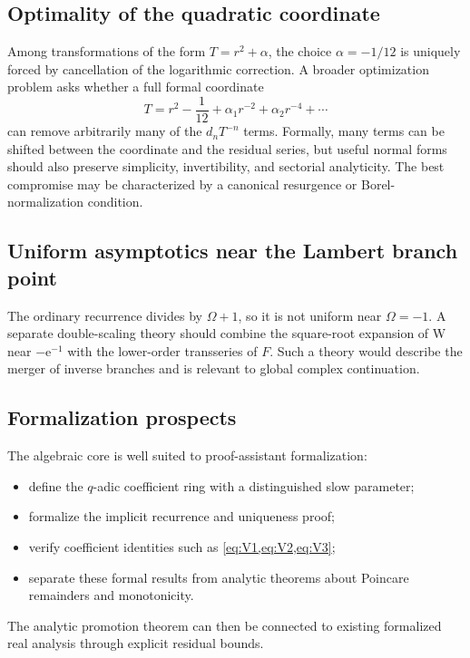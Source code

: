 \documentclass[11pt,a4paper]{article}
\numberwithin{equation}{section}
\theoremstyle{remark}
\newcommand{\e}{\mathrm e}
\begin{document}
\subsection{Optimality of the quadratic coordinate}

Among transformations of the form \(T=r^2+\alpha\), the choice
\(\alpha=-1/12\) is uniquely forced by cancellation of the logarithmic
correction.  A broader optimization problem asks whether a full formal
coordinate
\[
T=r^2-\frac1{12}+\alpha_1r^{-2}+\alpha_2r^{-4}+\cdots
\]
can remove arbitrarily many of the \(d_nT^{-n}\) terms.  Formally, many terms
can be shifted between the coordinate and the residual series, but useful
normal forms should also preserve simplicity, invertibility, and sectorial
analyticity.  The best compromise may be characterized by a canonical
resurgence or Borel-normalization condition.

\subsection{Uniform asymptotics near the Lambert branch point}

The ordinary recurrence divides by \(\Omega+1\), so it is not uniform near
\(\Omega=-1\).  A separate double-scaling theory should combine the
square-root expansion of W near \(-\e^{-1}\) with the lower-order
transseries of \(F\).  Such a theory would describe the merger of inverse
branches and is relevant to global complex continuation.

\subsection{Formalization prospects}

The algebraic core is well suited to proof-assistant formalization:
\begin{itemize}
\item define the \(q\)-adic coefficient ring with a distinguished slow
parameter;
\item formalize the implicit recurrence and uniqueness proof;
\item verify coefficient identities such as \cref{eq:V1,eq:V2,eq:V3};
\item separate these formal results from analytic theorems about Poincare
remainders and monotonicity.
\end{itemize}
The analytic promotion theorem can then be connected to existing formalized
real analysis through explicit residual bounds.
\end{document}
